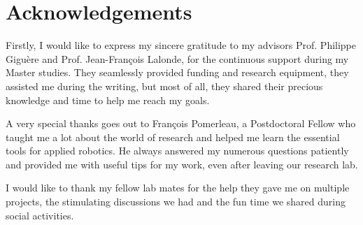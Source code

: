 \chapter*{Acknowledgements}

Firstly, I would like to express my sincere gratitude to my advisors Prof. Philippe Giguère and Prof. Jean-François Lalonde, for the continuous support during my Master studies. They seamlessly provided funding and research equipment, they assisted me during the writing, but most of all, they shared their precious knowledge and time to help me reach my goals. 

A very special thanks goes out to François Pomerleau, a Postdoctoral Fellow who taught me a lot about the world of research and helped me learn the essential tools for applied robotics. He always answered my numerous questions patiently and provided me with useful tips for my work, even after leaving our research lab.

I would like to thank my fellow lab mates for the help they gave me on multiple projects, the stimulating discussions we had and the fun time we shared during social activities.  
